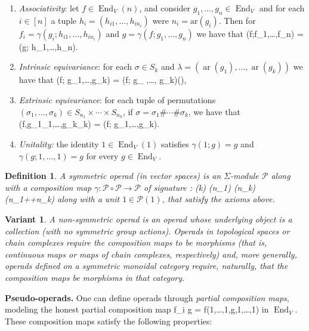 \documentclass[fleqn, a4paper, twoside]{article}
\makeatletter
\newcommand{\0}{\langle 0\rangle}
\newcommand{\End}{\operatorname{End}}
\newcommand{\ari}{\operatorname{ar}}
\newenvironment{tenumerate}{
 \begin{enumerate}
  \setlength{\itemsep}{0pt}
  \setlength{\parskip}{0pt}
}{\end{enumerate}}
\let\[\@undefined
\DeclareRobustCommand{\[}{\begin{equation}}%
\let\]\@undefined
\DeclareRobustCommand{\]}{\end{equation}}%
\theoremstyle{mytheorem}
\theoremstyle{introthm}
\theoremstyle{mydefinition}
\newtheorem{definition}[theorem]{Definition}
\newtheorem{variante}[theorem]{Variant}
\theoremstyle{mydefinition2}
\theoremstyle{plain} %
\newcommand{\?}{\,?\,}
\newcommand{\PP}{{\mathcal{P}}}
\theoremstyle{mytheorem}
\theoremstyle{plain} %
\makeatother
\begin{document}
\begin{tenumerate}
\item \emph{Associativity}: let $f\in \End_V(n)$,
and consider $g_1,\ldots,g_n \in \End_V$ and
for each $i\in [n]$ a tuple $h_i= (h_{i1},\ldots,h_{i n_i})$
were $n_i= \mathrm{ar}(g_i)$. Then for
$f_i = \gamma(g_i; h_{i1},\ldots,h_{in_i})$ 
and $g= \gamma(f; g_1,\ldots,g_n)$ we have
that
\[ \gamma(f;f_1,\ldots,f_n) = 
	\gamma(g; h_1,\ldots,h_n).\]
\item \emph{Intrinsic equivariance}: for
each $\sigma\in S_k$ and $\lambda = (\ari(g_1),\ldots,\ari(g_k))$ we have that
\[ \gamma(f\sigma; g_1,\ldots,g_k) = 	
	\gamma(f; g_{} ,\ldots, 
		g_{\sigma k})\lambda(\sigma),\]
	
\item \emph{Extrinsic equivariance}: for each
tuple of permutations $(\sigma_1,\ldots,\sigma_k) \in S_{n_1} \times
\cdots \times S_{n_k}$, if $\sigma = \sigma_1\#\cdots\#\sigma_k$, we have that
\[\gamma(f,g_1\sigma_1,\ldots,g_k\sigma_k) = 
	\gamma(f; g_1,\ldots,g_k)\sigma.\]
\item \emph{Unitality:} the identity $1\in\End_V(1)$
satisfies $\gamma(1;g) = g$ and $\gamma(g;1,\ldots,1) = g$ for every $g\in\End_V$.
\end{tenumerate}

\begin{definition} 
A symmetric operad (in vector spaces) is an
$\Sigma$-module $\PP$ along with a composition
map $\gamma : \PP\circ \PP \longrightarrow \PP$
of signature
\[\gamma : \PP(k)\otimes 
	\PP(n_1) \otimes \cdots \otimes \PP(n_k)
	 	\longrightarrow \PP(n_1+\cdots+n_k)\]
along with a unit $1\in \PP(1)$, that satisfy
the axioms above. 
\end{definition} 

\begin{variante} A non-symmetric operad is
an operad whose underlying object is a collection
(with no symmetric group actions). Operads in
topological spaces or chain complexes require
the composition maps to be morphisms (that is,
continuous maps or maps of chain complexes,
respectively) and, more generally, operads 
defined on a symmetric monoidal category
require, naturally, that the composition
maps be morphisms in that category. 
\end{variante}

\textbf{Pseudo-operads.}
One can define operads through \emph{partial 
composition maps}, modeling the honest partial
composition map
\[ f\circ_i g = f(1,\ldots,1,g,1,\ldots,1)\] 
in $\End_V$. These composition maps satisfy the
following properties:
\end{document}
